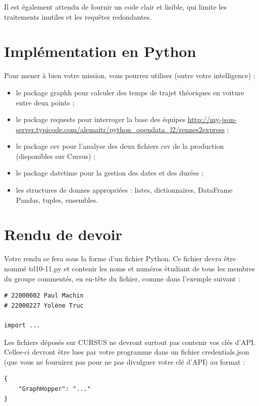\documentclass[11pt,a4paper]{article}
\begin{document}
Il est également attendu de fournir un code clair et lisible, qui limite les traitements inutiles et les requêtes redondantes.

\section{Implémentation en Python}

Pour mener à bien votre mission, vous pourrez utiliser (outre votre intelligence) :
\begin{itemize}
\item le package graphh pour calculer des temps de trajet théoriques en voiture entre deux points ;
\item le package requests pour interroger la base des équipes \url{http://my-json-server.typicode.com/alemaitr/python_opendata_l2/rennes2express} ;
\item le package csv pour l'analyse des deux fichiers csv de la production (disponibles sur Cursus) ;
\item le package datetime pour la gestion des dates et des durées ;
\item les structures de donnes appropriées : listes, dictionnaires, DataFrame Pandas, tuples, ensembles.
\end{itemize}

\section{Rendu de devoir}
Votre rendu se fera sous la forme d’un
fichier Python. Ce fichier devra être nommé td10-11.py et contenir les noms et numéros étudiant de tous
les membres du groupe commentés, en en-tête du fichier, comme dans l’exemple suivant :
\begin{verbatim}
# 22000002 Paul Machin
# 22000227 Yolène Truc

import ...
\end{verbatim}
Les fichiers déposés sur CURSUS ne devront surtout pas contenir vos clés d’API. Celles-ci devront être lues par votre programme dans un fichier credentials.json (que vous ne fournirez pas pour ne pas divulguer votre clé d’API) au format :
\begin{verbatim}
{
    "GraphHopper": "..."
}
\end{verbatim}
\end{document}
